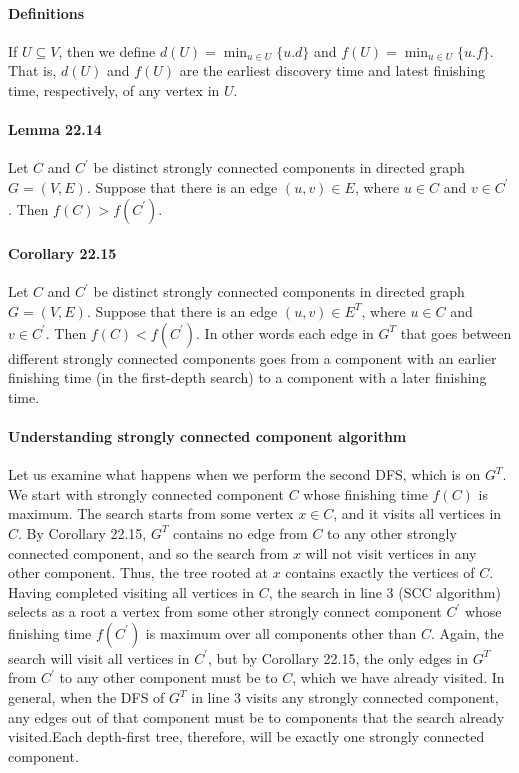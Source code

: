 \documentclass{book}
\begin{document}
	\paragraph{Definitions}If $U \subseteq V$, then we define $d(U)=\min_{u \in U}\{u.d\}$ and $f(U) = \min_{u \in U}\{u.f\}$. That is, $d(U)$ and $f(U)$ are the earliest discovery time and latest finishing time, respectively, of any vertex in $U$.
	
	\paragraph{Lemma 22.14} Let $C$ and $C^\prime$ be distinct strongly connected components in directed graph $G=(V,E)$. Suppose that there is an edge $(u, v) \in E$, where $u \in C$ and $v \in C^\prime$. Then $f(C) > f(C^\prime)$.
	
	\paragraph{Corollary 22.15} Let $C$ and $C^\prime$ be distinct strongly connected components in directed graph $G=(V,E)$. Suppose that there is an edge $(u, v) \in E^T$, where $u \in C$ and $v \in C^\prime$. Then $f(C) < f(C^\prime)$. In other words each edge in $G^T$ that goes between different strongly connected components goes from a component with an earlier finishing time (in the first-depth search) to a component with a later finishing time.
	
	\paragraph{Understanding strongly connected component algorithm} Let us examine what happens when we perform the second DFS, which is on $G^T$. We start with strongly connected component $C$ whose finishing time $f(C)$ is maximum. The search starts from some vertex $x \in C$, and it visits all vertices in $C$. By Corollary 22.15, $G^T$ contains no edge from $C$ to any other strongly connected component, and so the search from $x$ will not visit vertices in any other component. Thus, the tree rooted at $x$ contains exactly the vertices of $C$. Having completed visiting all vertices in $C$, the search in line 3 (SCC algorithm) selects as a root a vertex from some other strongly connect component $C^\prime$ whose finishing time $f(C^\prime)$ is maximum over all components other than $C$. Again, the search will visit all vertices in $C^\prime$, but by Corollary 22.15, the only edges in $G^T$ from $C^\prime$ to any other component must be to $C$, which we have already visited. In general, when the DFS of $G^T$ in line 3 visits any strongly connected component, any edges out of that component must be to components that the search already visited.Each depth-first tree, therefore, will be exactly one strongly connected component.
	
\end{document}
